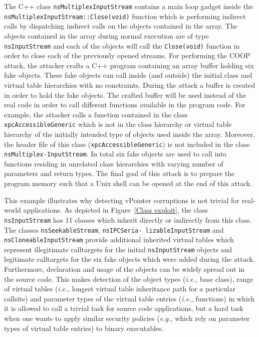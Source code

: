 The C++ class \texttt{nsMultiplexInputStream} contains a main loop gadget inside the \texttt{nsMultiplexInputStream::Close(void)} function which is performing indirect calls by dispatching indirect calls on the objects contained in the array. The objects contained in the array during normal execution are of type \texttt{nsInputStream} and each of the objects will call the \texttt{Close(void)} function in order to close each of the previously opened streams. For performing the COOP attack, the attacker crafts a C++ program containing an array buffer holding six fake objects. These fake objects can call inside (and outside) the initial class and virtual table hierarchies with no constraints. During the attack a buffer is created in order to hold the fake objects.
The crafted buffer will be used instead of the real code in order to call different functions available in the program code. For example, the attacker calls a function contained in the class \texttt{xpcAccessibleGeneric} which is not in the class hierarchy or virtual table hierarchy of the initially intended type of objects used inside the array. Moreover, the header file of this class (\texttt{xpcAccessibleGeneric}) is not included in the class \texttt{nsMultiplex-InputStream}. In total six fake objects are used to call into functions residing in unrelated class hierarchies with varying number of parameters and return types. The final goal of this attack is to prepare the program memory such that a Unix shell can be opened at the end of this attack.

This example illustrates why detecting vPointer corruptions is not trivial for real-world applications. As depicted in Figure~\ref{Class exploit}, the class \texttt{nsInputStream} has 11 classes which inherit directly or indirectly from this class. The classes \texttt{nsSeekableStream}, \texttt{nsIPCSeria- lizableInputStream} and \texttt{nsCloneableInputStream} provide additional inherited virtual tables which represent illegitimate calltargets for the initial \texttt{nsInputStream} objects and legitimate calltargets for the six fake objects which were added during the attack. Furthermore, declaration and usage of the objects can be widely spread out in the source code. This makes detection of the object types (\textit{i.e.,} base class), range of virtual tables (\textit{i.e.,} longest virtual table inheritance path for a particular callsite) and parameter types of the virtual table entries (\textit{i.e.,} functions) in which it is allowed to call a trivial task for source code applications, but a hard task when one wants to apply similar security policies 
(\textit{e.g.,} which rely on parameter types of virtual table entries) to binary executables.




